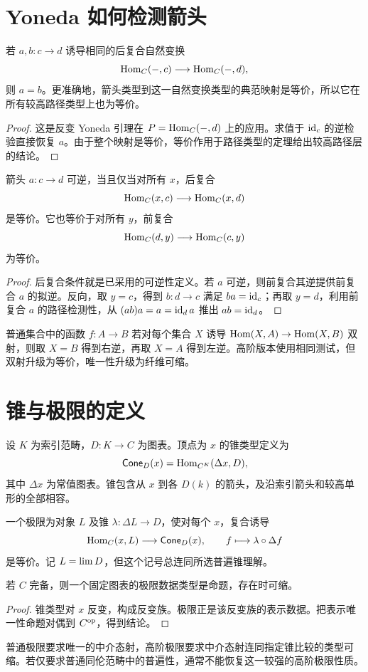 \section{Yoneda 如何检测箭头}
\begin{proposition}[由测试映射检测同一性]
若 $a,b:c\to d$ 诱导相同的后复合自然变换
\[
\operatorname{Hom}_C(-,c)\longrightarrow\operatorname{Hom}_C(-,d),
\]
则 $a=b$。更准确地，箭头类型到这一自然变换类型的典范映射是等价，所以它在所有较高路径类型上也为等价。
\end{proposition}
\begin{proof}
这是反变 Yoneda 引理在 $P=\operatorname{Hom}_C(-,d)$ 上的应用。求值于 $\operatorname{id}_c$ 的逆检验直接恢复 $a$。由于整个映射是等价，等价作用于路径类型的定理给出较高路径层的结论。
\end{proof}
\begin{proposition}[由映射空间检测可逆性]
箭头 $a:c\to d$ 可逆，当且仅当对所有 $x$，后复合
\[
\operatorname{Hom}_C(x,c)\longrightarrow\operatorname{Hom}_C(x,d)
\]
是等价。它也等价于对所有 $y$，前复合
\[
\operatorname{Hom}_C(d,y)\longrightarrow\operatorname{Hom}_C(c,y)
\]
为等价。
\end{proposition}
\begin{proof}
后复合条件就是已采用的可逆性定义。若 $a$ 可逆，则前复合其逆提供前复合 $a$ 的拟逆。反向，取 $y=c$，得到 $b:d\to c$ 满足 $ba=\operatorname{id}_c$；再取 $y=d$，利用前复合 $a$ 的路径检测性，从 $(ab)a=a=\operatorname{id}_d a$ 推出 $ab=\operatorname{id}_d$。
\end{proof}
\begin{example}
普通集合中的函数 $f:A\to B$ 若对每个集合 $X$ 诱导 $\operatorname{Hom}(X,A)\to\operatorname{Hom}(X,B)$ 双射，则取 $X=B$ 得到右逆，再取 $X=A$ 得到左逆。高阶版本使用相同测试，但双射升级为等价，唯一性升级为纤维可缩。
\end{example}

\section{锥与极限的定义}
\begin{definition}[锥]
设 $K$ 为索引范畴，$D:K\to C$ 为图表。顶点为 $x$ 的锥类型定义为
\[
\mathsf{Cone}_D(x)=\operatorname{Hom}_{C^K}(\Delta x,D),
\]
其中 $\Delta x$ 为常值图表。锥包含从 $x$ 到各 $D(k)$ 的箭头，及沿索引箭头和较高单形的全部相容。
\end{definition}
\begin{definition}[极限]
一个极限为对象 $L$ 及锥 $\lambda:\Delta L\to D$，使对每个 $x$，复合诱导
\[
\operatorname{Hom}_C(x,L)\longrightarrow\mathsf{Cone}_D(x),
\qquad f\longmapsto\lambda\circ\Delta f
\]
是等价。记 $L=\operatorname*{lim} D$，但这个记号总连同所选普遍锥理解。
\end{definition}
\begin{proposition}
若 $C$ 完备，则一个固定图表的极限数据类型是命题，存在时可缩。
\end{proposition}
\begin{proof}
锥类型对 $x$ 反变，构成反变族。极限正是该反变族的表示数据。把表示唯一性命题对偶到 $C^{\mathrm{op}}$，得到结论。
\end{proof}
\begin{remark}
普通极限要求唯一的中介态射，高阶极限要求中介态射连同指定锥比较的类型可缩。若仅要求普通同伦范畴中的普遍性，通常不能恢复这一较强的高阶极限性质。
\end{remark}

